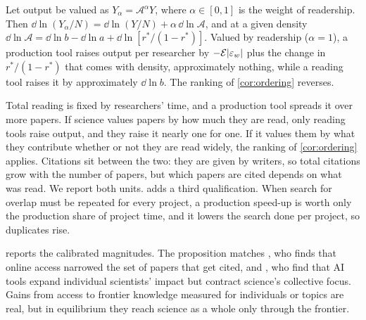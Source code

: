 \begin{proposition}\label{prop:audience}
Let output be valued as $Y_\alpha=\mathcal A^\alpha Y$, where $\alpha\in[0,1]$ is
the weight of readership. Then
$\dd\ln(Y_\alpha/N)=\dd\ln(Y/N)+\alpha\,\dd\ln\mathcal A$, and at a given density
$\dd\ln\mathcal A=\dd\ln b-\dd\ln a+\dd\ln[r^*/(1-r^*)]$. Valued by readership
($\alpha=1$), a production tool raises output per researcher by
$-\mathcal E|\varepsilon_w|$ plus the change in $r^*/(1-r^*)$ that comes with density,
approximately nothing, while a reading tool raises it by approximately
$\dd\ln b$. The ranking of \cref{cor:ordering} reverses.
\end{proposition}

Total reading is fixed by researchers' time, and a production tool spreads it
over more papers. If science values papers by how much they are read, only
reading tools raise output, and they raise it nearly one for one. If it values
them by what they contribute whether or not they are read widely, the ranking
of \cref{cor:ordering} applies. Citations sit between the two: they are given
by writers, so total citations grow with the number of papers, but which papers
are cited depends on what was read. We report both units. 
adds a third qualification. When search for overlap must be repeated for every
project, a production speed-up is worth only the production share of project
time, and it lowers the search done per project, so duplicates rise.

\begin{table}[t]
\centering
\caption{The incidence of new research tools in the calibrated model}\label{tab:ai}

\end{table}

 reports the calibrated magnitudes. The proposition matches
\citet{evans2008}, who finds that online access narrowed the set of papers
that get cited, and \citet{haoetal2026}, who find that AI tools expand
individual scientists' impact but contract science's collective focus. Gains
from access to frontier knowledge measured for individuals or topics
\citep{iariaetal2018,biasimoser2021} are real, but in equilibrium they reach
science as a whole only through the frontier.

